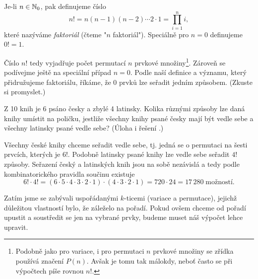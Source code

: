 \begin{definition}[Faktoriál]\label{def:faktorial}
    Je-li $n\in\mathbb{N}_0$, pak definujeme číslo
    \begin{equation*}
        n!=n(n-1)(n-2)\cdots 2\cdot 1=\prod_{i=1}^{n}i,
    \end{equation*}
    které nazýváme \emph{faktoriál} (čteme "$n$ faktoriál"). Speciálně pro $n=0$ definujeme $0!=1$.
\end{definition}

Číslo $n!$ tedy vyjadřuje počet permutací $n$ prvkové množiny\footnote{Podobně jako pro variace, i pro permutaci $n$ prvkové množiny se zřídka používá značení $P(n)$. Avšak je tomu tak málokdy, neboť často se při výpočtech píše rovnou $n!$.}. Zároveň se podívejme ještě na speciální případ $n=0$. Podle naší definice a významu, který přidružujeme faktoriálu, říkáme, že 0 prvků lze seřadit jedním způsobem. (Zkuste si promyslet.)

\begin{task}
    Z 10 knih je 6 psáno česky a zbylé 4 latinsky. Kolika různými způsoby lze daná knihy umístit na poličku, jestliže všechny knihy psané česky mají být vedle sebe a všechny latinsky psané vedle sebe? (Úloha i řešení \cite{Havrlant2022}.)
\end{task}
\begin{solution}
    Všechny české knihy chceme seřadit vedle sebe, tj. jedná se o permutaci na šesti prvcích, kterých je $6!$. Podobně latinsky psané knihy lze vedle sebe seřadit $4!$ způsoby. Seřazení český a latinských knih jsou na sobě nezávislá a tedy podle kombinatorického pravidla součinu existuje
    \begin{equation*}
        6!\cdot 4!=(6\cdot 5\cdot 4\cdot 3\cdot 2\cdot 1)\cdot(4\cdot 3\cdot 2\cdot 1)=720\cdot 24=17\,280\;\text{možností.}
    \end{equation*}
\end{solution}

Zatím jsme se zabývali uspořádanými $k$-ticemi (variace a permutace), jejichž důležitou vlastností bylo, že záleželo na pořadí. Pokud ovšem chceme od pořadí upustit a soustředit se jen na vybrané prvky, budeme muset náš výpočet lehce upravit.

